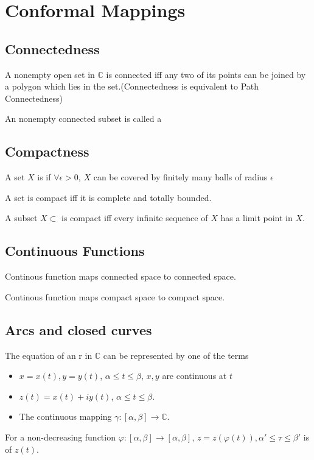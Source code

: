 \section{Conformal Mappings}

\subsection{Connectedness}
\begin{theorem}
    A nonempty open set in  $ \mathbb{C} $ is connected iff any two of its points can be joined by a polygon  which lies in the set.(\ie Connectedness is equivalent to Path Connectedness)
\end{theorem}
An nonempty connected subset is called a 
\subsection{Compactness}
\begin{definition}
     A set  $ X  $ is  if  $ \forall \epsilon>0  $,  $ X  $ can be covered by finitely many balls of radius  $ \epsilon  $ 
     
\end{definition}
\begin{theorem}
    A set is compact iff it is complete and totally bounded.
 \end{theorem}
\begin{theorem}
    A subset  $ X\subset $ is compact iff every infinite sequence of  $ X  $ has a limit point in  $ X  $.
\end{theorem}
\subsection{Continuous Functions}
\begin{theorem}
    Continous function maps connected space to connected space.
\end{theorem}
\begin{theorem}
    Continous function maps compact space to compact space.
\end{theorem}
\subsection[short]{Arcs and closed curves}
The equation of an  r in  $ \mathbb{C} $ can  be represented by one of the terms
\begin{itemize}
    \item  $ x=x(t),y=y(t) $, $ \alpha \leq t  \leq \beta$,  $ x,y $ are continuous at  $ t $
    \item  $ z(t)=x(t)+iy(t) $, $ \alpha \leq t \leq \beta $.
    \item The  continuous mapping  $ \gamma:[\alpha,\beta]\rightarrow \mathbb{C} $. 
\end{itemize}
For a non-decreasing function  $ \varphi:[\alpha,\beta]\rightarrow[\alpha,\beta] $,  $ z=z(\varphi(t)),\alpha' \leq \tau \leq \beta' $ is   of  $ z(t) $.

